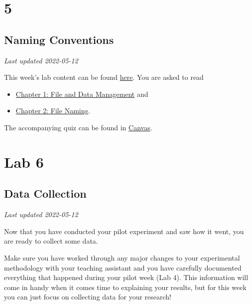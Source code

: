 \documentclass[
]{book}
\providecommand{\tightlist}{%
  \setlength{\itemsep}{0pt}\setlength{\parskip}{0pt}}
\begin{document}
\hypertarget{part-5}{%
\part*{5}\label{part-5}}

\hypertarget{naming-conventions}{%
\chapter*{Naming Conventions}\label{naming-conventions}}

\emph{Last updated 2022-05-12}

This week's lab content can be found \href{https://ubco-biology.github.io/Procedures-and-Guidelines/file-and-data-management.html}{here}. You are asked to read

\begin{itemize}
\tightlist
\item
  \href{https://ubco-biology.github.io/Procedures-and-Guidelines/file-and-data-management.html}{Chapter 1: File and Data Management} and
\item
  \href{https://ubco-biology.github.io/Procedures-and-Guidelines/file-naming.html}{Chapter 2: File Naming}.
\end{itemize}

The accompanying quiz can be found in \href{https://canvas.ubc.ca}{Canvas}.

\hypertarget{part-lab-6}{%
\part*{Lab 6}\label{part-lab-6}}

\hypertarget{data-collection}{%
\chapter*{Data Collection}\label{data-collection}}

\emph{Last updated 2022-05-12}

Now that you have conducted your pilot experiment and saw how it went, you are ready to collect some data.

Make sure you have worked through any major changes to your experimental methodology with your teaching assistant and you have carefully documented everything that happened during your pilot week (Lab 4). This information will come in handy when it comes time to explaining your results, but for this week you can just focus on collecting data for your research!
\end{document}
